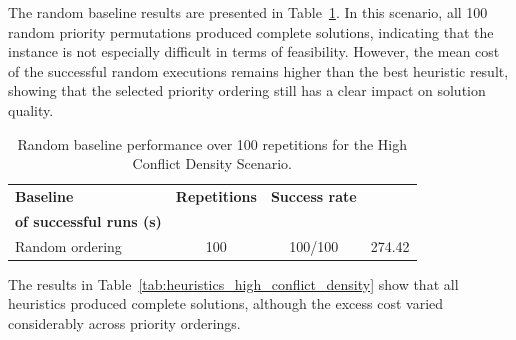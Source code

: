 The random baseline results are presented in
Table~\ref{tab:random_baseline_high_conflict_density}. In this scenario, all 100 random priority
permutations produced complete solutions, indicating that the instance is not especially difficult in
terms of feasibility. However, the mean cost of the successful random executions remains higher
than the best heuristic result, showing that the selected priority ordering still has a clear impact on
solution quality.

\begin{table}[H]
\centering
\caption{Random baseline performance over 100 repetitions for the High Conflict Density Scenario.}
\label{tab:random_baseline_high_conflict_density}
\footnotesize
\setlength{\tabcolsep}{6pt}
\begin{tabular}{@{}lccc@{}}
\toprule
\textbf{Baseline} & \textbf{Repetitions} & \textbf{Success rate} & \makecell{\textbf{Mean excess cost}\\\textbf{of successful runs (s)}} \\
\midrule
Random ordering & 100 & 100/100 & 274.42 \\
\bottomrule
\end{tabular}
\end{table}

The results in Table~\ref{tab:heuristics_high_conflict_density} show that all heuristics produced
complete solutions, although the excess cost varied considerably across priority orderings.

